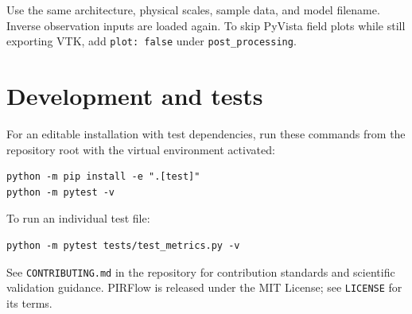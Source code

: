 \documentclass[11pt,a4paper]{article}
\newcommand{\code}[1]{\nolinkurl{#1}}
\begin{document}
Use the same architecture, physical scales, sample data, and model filename.
Inverse observation inputs are loaded again. To skip PyVista field plots while
still exporting VTK, add \code{plot: false} under \code{post_processing}.

\section{Development and tests}
\label{sec:development}

For an editable installation with test dependencies, run these commands from
the repository root with the virtual environment activated:

\begin{lstlisting}
python -m pip install -e ".[test]"
python -m pytest -v
\end{lstlisting}

To run an individual test file:

\begin{lstlisting}
python -m pytest tests/test_metrics.py -v
\end{lstlisting}

See \code{CONTRIBUTING.md} in the repository for contribution standards and
scientific validation guidance. PIRFlow is released under the MIT License;
see \code{LICENSE} for its terms.
\end{document}
